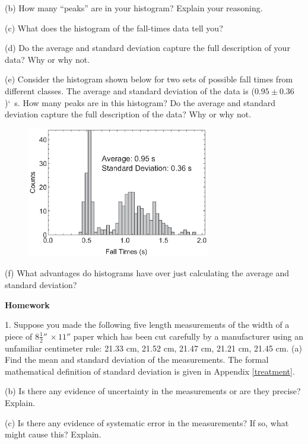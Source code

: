 (b) How many ``peaks'' are in your histogram? Explain your reasoning.
\answerspace{10mm}

(c) What does the histogram of the fall-times data tell you?
\answerspace{15mm}

(d) Do the average and standard deviation capture the full description of your data? Why or why not.
\answerspace{15mm}

(e) Consider the histogram shown below for two sets of possible fall times from different classes. 
The average and standard deviation of the data is ($0.95\pm 0.36$)`~s. How many peaks are in this
histogram? Do the average and standard deviation capture the full description of the data? Why or why not.

\begin{figure}[hb]
\includegraphics[height=2.25in]{measurement_uncertainty/histogram_gray.eps}\label{SampleHist1}
\end{figure}

(f) What advantages do histograms have over just calculating the average and standard deviation?
\answerspace{20mm}

\textbf{Homework} 

1. Suppose you made the following five length measurements of the width of a
piece of $8\frac{1}{2} {}''\, \times 11''$ paper which has been cut carefully by
a manufacturer using an unfamiliar centimeter rule: 21.33 cm, 21.52 cm, 21.47
cm, 21.21 cm, 21.45 cm. (a) Find the mean and standard deviation of the measurements.
The formal mathematical definition of standard deviation 
is given in Appendix \ref{treatment}. 
\vspace{30mm}

(b) Is there any evidence of uncertainty in the measurements or are they precise?
Explain. 
\vspace{20mm}

(c) Is there any evidence of systematic error in the measurements? If so, what
might cause this? Explain.
\vspace{20mm}


